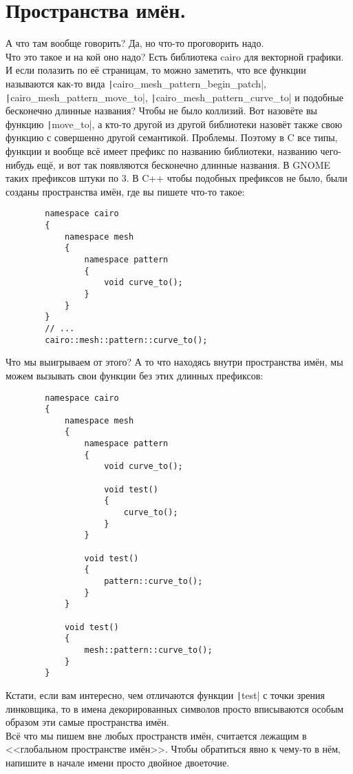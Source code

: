 \documentclass{article}
\begin{document}
    \section{Пространства имён.}
    А что там вообще говорить? Да, но что-то проговорить надо.\\
    Что это такое и на кой оно надо? Есть библиотека cairo для векторной графики. И если полазить по её страницам, то можно заметить, что все функции называются как-то вида \texttt|cairo_mesh_pattern_begin_patch|, \texttt|cairo_mesh_pattern_move_to|, \texttt|cairo_mesh_pattern_curve_to| и подобные бесконечно длинные названия? Чтобы не было коллизий. Вот назовёте вы функцию \texttt|move_to|, а кто-то другой из другой библиотеки назовёт также свою функцию с совершенно другой семантикой. Проблемы. Поэтому в C все типы, функции и вообще всё имеет префикс по названию библиотеки, названию чего-нибудь ещё, и вот так появляются бесконечно длинные названия. В GNOME таких префиксов штуки по 3. В C++ чтобы подобных префиксов не было, были созданы пространства имён, где вы пишете что-то такое:
    \begin{verbatim}
        namespace cairo
        {
            namespace mesh
            {
                namespace pattern
                {
                    void curve_to();
                }
            }
        }
        // ...
        cairo::mesh::pattern::curve_to();
    \end{verbatim}
    Что мы выигрываем от этого? А то что находясь внутри пространства имён, мы можем вызывать свои функции без этих длинных префиксов:
    \begin{verbatim}
        namespace cairo
        {
            namespace mesh
            {
                namespace pattern
                {
                    void curve_to();

                    void test()
                    {
                        curve_to();
                    }
                }

                void test()
                {
                    pattern::curve_to();
                }
            }

            void test()
            {
                mesh::pattern::curve_to();
            }
        }
    \end{verbatim}
    Кстати, если вам интересно, чем отличаются функции \texttt|test| с точки зрения линковщика, то в имена декорированных символов просто вписываются особым образом эти самые пространства имён.\\
    Всё что мы пишем вне любых пространств имён, считается лежащим в <<глобальном пространстве имён>>. Чтобы обратиться явно к чему-то в нём, напишите в начале имени просто двойное двоеточие.
\end{document}
